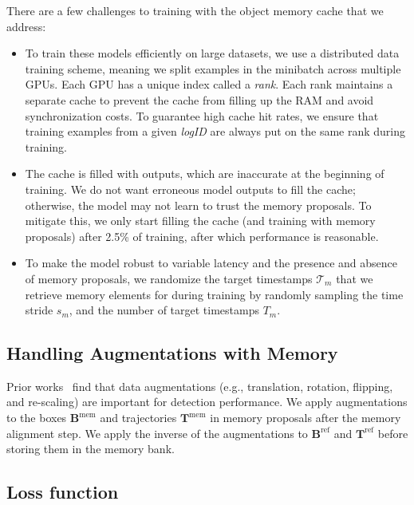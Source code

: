 There are a few challenges to training with the object memory cache that we address:
\begin{itemize}
    \item To train these models efficiently on large datasets, we use a distributed data training scheme, meaning we split examples in the minibatch across multiple GPUs. Each GPU has a unique index called a \textit{rank}. Each rank maintains a separate cache to prevent the cache from filling up the RAM and avoid synchronization costs. To guarantee high cache hit rates, we ensure that training examples from a given \textit{logID} are always put on the same rank during training.
    \item The cache is filled with \ourmodel{} outputs, which are inaccurate at the beginning of training. We do not want erroneous model outputs to fill the cache; otherwise, the model may not learn to trust the memory proposals. To mitigate this, we only start filling the cache (and training with memory proposals) after 2.5\% of training, after which performance is reasonable.
    \item To make the model robust to variable latency and
    the presence and absence of memory proposals, we randomize the target timestamps $\mathcal{T}_m$ that we retrieve memory elements for during training by randomly sampling the time stride $s_m$, and the number of target timestamps $T_m$.
\end{itemize}



\subsection{Handling Augmentations with Memory}

Prior works~\cite{safdnet,hednet,centerpoint,leng2023lidar} find that
data augmentations (e.g., translation, rotation, flipping, and re-scaling) are important for detection performance.
We apply augmentations to the boxes $\mathbf{B}^{\mathrm{mem}}$ and trajectories $\mathbf{T}^{\mathrm{mem}}$ in memory proposals
after the memory alignment step. We apply the inverse of the augmentations to $\mathbf{B}^\mathrm{ref}$ and $\mathbf{T}^\mathrm{ref}$ before storing them in the memory bank.

\subsection{Loss function} \label{sec:learning}

